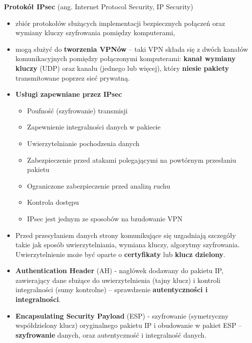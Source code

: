 \documentclass[main.tex]{subfiles}
\begin{document}
    \noindent \textbf{Protokół IPsec} (ang. Internet Protocol Security, IP Security)
    \begin{itemize}[noitemsep]
        \item zbiór protokołów służących implementacji bezpiecznych połączeń oraz wymiany kluczy szyfrowania pomiędzy
        komputerami,
        \item mogą służyć do \textbf{tworzenia VPNów} -- taki VPN składa się z dwóch kanałów komunikacyjnych pomiędzy
        połączonymi komputerami: \textbf{kanał wymiany kluczy} (UDP) oraz kanału (jednego lub więcej), który \textbf{niesie
        pakiety} transmitowane poprzez sieć prywatną.
        \item \textbf{Usługi zapewniane przez IPsec}
        \begin{itemize}[noitemsep]
            \item Poufność (szyfrowanie) transmisji
            \item Zapewnienie integralności danych w pakiecie
            \item Uwierzytelnianie pochodzenia danych
            \item Zabezpieczenie przed atakami polegającymi na powtórnym przesłaniu pakietu
            \item Ograniczone zabezpieczenie przed analizą ruchu
            \item Kontrola dostępu
            \item IPsec jest jednym ze sposobów na bzudowanie VPN
        \end{itemize}

        \item Przed przesyłaniem danych strony komunikujące się uzgadniają szczegóły takie jak sposób uwierzytelniania,
        wymiana kluczy, algorytmy szyfrowania. Uwierzytelnienie może być oparte o \textbf{certyfikaty} lub
        \textbf{klucz dzielony}.

        \item \textbf{Authentication Header} (AH) - nagłówek dodawany do pakietu IP, zawierający dane służące do
        uwierzytelnienia (tajny klucz) i kontroli integralności (sumy kontrolne) -- sprawdzenie \textbf{autentyczności
        i integralności}.

        \item \textbf{Encapsulating Security Payload} (ESP) - szyfrowanie (symetryczny współdzielony klucz)
        oryginalnego pakietu IP i obudowanie w pakiet ESP -- \textbf{szyfrowanie} danych, oraz autentyczność i
        integralność danych.


\end{itemize}
\end{document}
